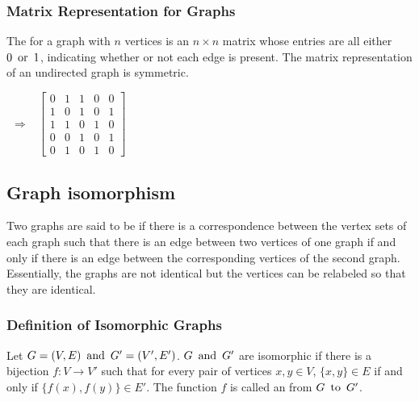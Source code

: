 \subsubsection*{Matrix Representation for Graphs}
The  for a graph with $n$ vertices is an $n \times n$ matrix whose entries are all either $0 \operatorname{~\text{or}~} 1$, indicating whether or not each edge is present. The matrix representation of an undirected graph is symmetric.
\begin{center}
   $~~\Rightarrow~~$
  $
    \begin{bmatrix}
      0 & 1 & 1 & 0 & 0 \\
      1 & 0 & 1 & 0 & 1 \\
      1 & 1 & 0 & 1 & 0 \\
      0 & 0 & 1 & 0 & 1 \\
      0 & 1 & 0 & 1 & 0
    \end{bmatrix}
  $
\end{center}

\subsection{Graph isomorphism}
Two graphs are said to be  if there is a correspondence between the vertex sets of each graph such that there is an edge between two vertices of one graph if and only if there is an edge between the corresponding vertices of the second graph. Essentially, the graphs are not identical but the vertices can be relabeled so that they are identical.

\subsubsection*{Definition of Isomorphic Graphs}
Let $G = (V,E) \operatorname{~\text{and}~} G'=(V',E')$. $G \operatorname{~\text{and}~} G'$ are isomorphic if there is a bijection $f: V \rightarrow V'$ such that for every pair of vertices $x,y \in V$, $\{x,y\} \in E$ if and only if $\{f(x), f(y)\} \in E'$. The function $f$ is called an  from $G \operatorname{~\text{to}~} G'$.


